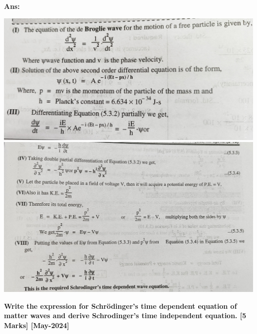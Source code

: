 \documentclass{exam}
\begin{document}
\begin{questions}
\textbf{Ans:}
\begin{center}
	\includegraphics[scale=0.1]{Q12-1.jpeg}
	\includegraphics[scale=0.125]{Q12-2.jpeg}
\end{center}

\newpage

\question \textbf{Write the expression for Schrödinger's time dependent equation of matter waves and derive Schrodinger's time independent equation. \hfil [5 Marks] [May-2024]} 


\end{questions}
\end{document}
